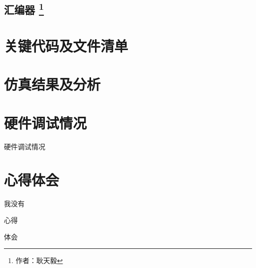 \documentclass{article}
\begin{document}
        \subsection{汇编器 \protect\footnote{作者：耿天毅}}

    \section{关键代码及文件清单}

    \section{仿真结果及分析}

    \section{硬件调试情况}
        硬件调试情况

    \section{心得体会}

        \begin{enumerate}
            \begin{item}
                我没有
            \end{item}
            \begin{item}
                心得
            \end{item}
            \begin{item}
                体会
            \end{item}
        \end{enumerate}
\end{document}
